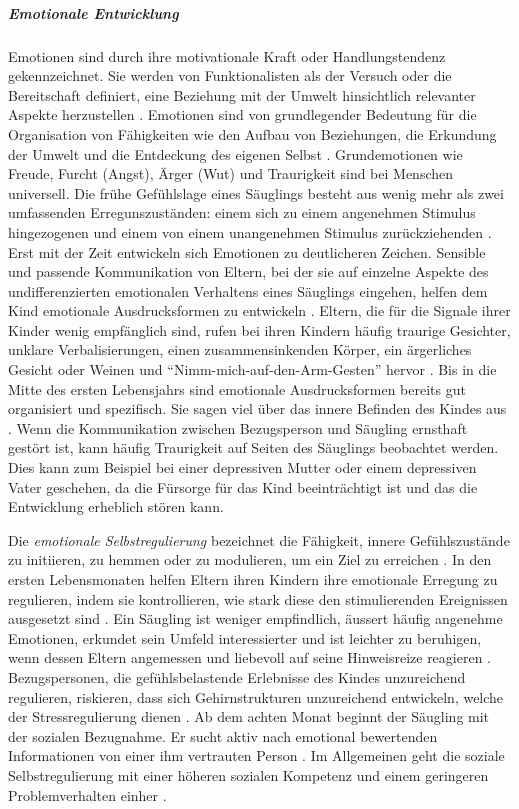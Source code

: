 \subparagraph{Emotionale Entwicklung}\label{par:EmotionaleEntwicklung}
Emotionen sind durch ihre motivationale Kraft oder Handlungstendenz gekennzeichnet. Sie werden von Funktionalisten als der Versuch oder die Bereitschaft definiert, eine Beziehung mit der Umwelt hinsichtlich relevanter Aspekte herzustellen \cite[S.~529 ff.]{Siegler2008}. Emotionen sind von grundlegender Bedeutung für die Organisation von Fähigkeiten wie den Aufbau von Beziehungen, die Erkundung der Umwelt und die Entdeckung des eigenen Selbst \cite{Halle2003, Saarni2006}. Grundemotionen wie Freude, Furcht (Angst), Ärger (Wut) und Traurigkeit sind bei Menschen universell. Die frühe Gefühlslage eines Säuglings besteht aus wenig mehr als zwei umfassenden Erregunszuständen: einem sich zu einem angenehmen Stimulus hingezogenen und einem von einem unangenehmen Stimulus zurückziehenden \cite{Camras2003, Fox1991}. Erst mit der Zeit entwickeln sich Emotionen zu deutlicheren Zeichen. Sensible und passende Kommunikation von Eltern, bei der sie auf einzelne Aspekte des undifferenzierten emotionalen Verhaltens eines Säuglings eingehen, helfen dem Kind emotionale Ausdrucksformen zu entwickeln \cite{Gergely1999}. Eltern, die für die Signale ihrer Kinder wenig empfänglich sind, rufen bei ihren Kindern häufig traurige Gesichter, unklare Verbalisierungen, einen zusammensinkenden Körper, ein ärgerliches Gesicht oder Weinen und \enquote{Nimm-mich-auf-den-Arm-Gesten} hervor \cite{Weinberg1994, Yale1999}. Bis in die Mitte des ersten Lebensjahrs sind emotionale Ausdrucksformen bereits gut organisiert und spezifisch. Sie sagen viel über das innere Befinden des Kindes aus \cite{Berk2011}. Wenn die Kommunikation zwischen Bezugsperson und Säugling ernsthaft gestört ist, kann häufig Traurigkeit auf Seiten des Säuglings beobachtet werden. Dies kann zum Beispiel bei einer depressiven Mutter oder einem depressiven Vater geschehen, da die Fürsorge für das Kind beeinträchtigt ist und das die Entwicklung erheblich stören kann.

Die \textit{emotionale Selbstregulierung} bezeichnet die Fähigkeit, innere Gefühlszustände zu initiieren, zu hemmen oder zu modulieren, um ein Ziel zu erreichen \cite{Siegler2008}. In den ersten Lebensmonaten helfen Eltern ihren Kindern ihre emotionale Erregung zu regulieren, indem sie kontrollieren, wie stark diese den stimulierenden Ereignissen ausgesetzt sind \cite{Gianino1988}. Ein Säugling ist weniger empfindlich, äussert häufig angenehme Emotionen, erkundet sein Umfeld interessierter und ist leichter zu beruhigen, wenn dessen Eltern angemessen und liebevoll auf seine Hinweisreize reagieren \cite{Crockenberg2004}. Bezugspersonen, die gefühlsbelastende Erlebnisse des Kindes unzureichend regulieren, riskieren, dass sich Gehirnstrukturen unzureichend entwickeln, welche der Stressregulierung dienen \cite[S.~250]{Berk2011}. Ab dem achten Monat beginnt der Säugling mit der sozialen Bezugnahme. Er sucht aktiv nach emotional bewertenden Informationen von einer ihm vertrauten Person \cite{Mumme2007}. Im Allgemeinen geht die soziale Selbstregulierung mit einer höheren sozialen Kompetenz und einem geringeren Problemverhalten einher \cite[S.~580]{Siegler2008}. 

